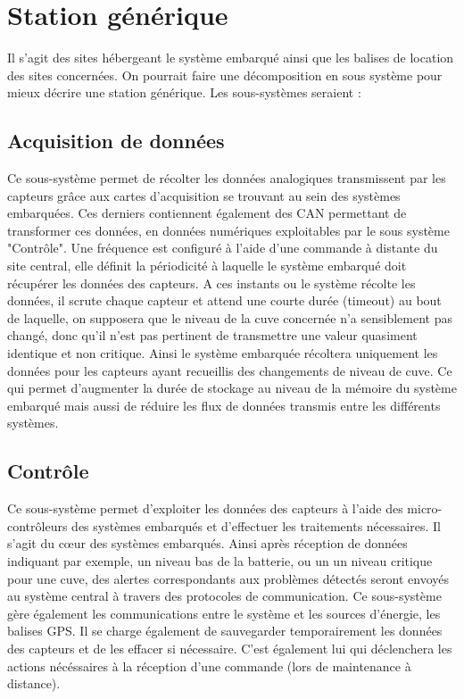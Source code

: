 \section{Station générique}
    Il s'agit des sites hébergeant le système embarqué ainsi que les balises de location des sites concernées. On pourrait faire une décomposition en sous système pour mieux décrire une station générique. Les sous-systèmes seraient :

       \subsection{Acquisition de données}
       Ce sous-système permet de récolter les données analogiques transmissent par les capteurs grâce aux cartes d'acquisition se trouvant au sein des systèmes embarquées. Ces derniers contiennent également des CAN permettant de transformer ces données, en données numériques exploitables par le sous système "Contrôle". Une fréquence est configuré à l'aide d'une commande à distante du site central, elle définit la périodicité à laquelle le système embarqué doit récupérer les données des capteurs. A ces instants ou le système récolte les données, il scrute chaque capteur et attend une courte durée (timeout) au bout de laquelle, on supposera que le niveau de la cuve concernée n'a sensiblement pas changé, donc qu'il n'est pas pertinent de transmettre une valeur quasiment identique et non critique. Ainsi le système embarquée récoltera uniquement les données pour les capteurs ayant recueillis des changements de niveau de cuve. Ce qui permet d'augmenter la durée de stockage au niveau de la mémoire du système embarqué mais aussi de réduire les flux de données transmis entre les différents systèmes.

       \subsection{Contrôle}
       Ce sous-système permet d'exploiter les données des capteurs à l'aide des micro-contrôleurs des systèmes embarqués et d'effectuer les traitements nécessaires. Il s'agit du cœur des systèmes embarqués. Ainsi après réception de données indiquant par exemple, un niveau bas de la batterie, ou un un niveau critique pour une cuve, des alertes correspondants aux problèmes détectés seront envoyés au système central à travers des protocoles de communication.
       Ce sous-système gère également les communications entre le système et les sources d'énergie, les balises GPS. Il se charge également de sauvegarder temporairement les données des capteurs et de les effacer si nécessaire. C'est également lui qui déclenchera les actions nécéssaires à la réception d'une commande (lors de maintenance à distance).

